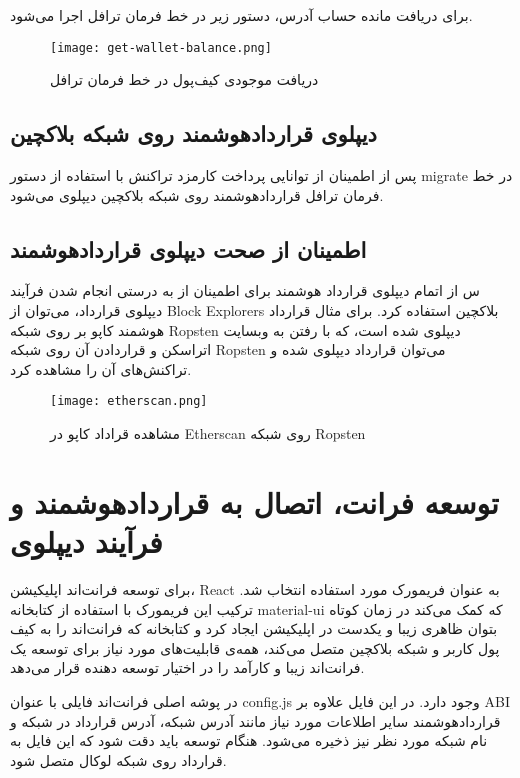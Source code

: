 برای دریافت مانده حساب آدرس، دستور زیر در خط فرمان ترافل اجرا می‌شود.

\begin{figure}[ht]
\centerline{\texttt{[image: get-wallet-balance.png]}}
\caption{دریافت موجودی کیف‌پول در خط فرمان ترافل}
\label{fig:get-wallet-balance}
\end{figure}


\subsection{دیپلوی قراردادهوشمند روی شبکه بلاکچین}
پس از اطمینان از توانایی پرداخت کارمزد تراکنش با استفاده از دستور migrate در خط فرمان ترافل قراردادهوشمند روی شبکه بلاکچین دیپلوی می‌شود.


\subsection{اطمینان از صحت دیپلوی قراردادهوشمند}
س از اتمام دیپلوی قرارداد هوشمند برای اطمینان از به درستی انجام شدن فرآیند دیپلوی قرارداد، می‌توان از
\glspl{Block Explorer}
بلاکچین استفاده کرد. برای مثال قرارداد هوشمند کاپو بر روی شبکه Ropsten دیپلوی شده است، که با رفتن به وبسایت اتراسکن
و قراردادن آن روی شبکه Ropsten می‌توان قرارداد دیپلوی شده و تراکنش‌های آن را مشاهده کرد.


\begin{figure}[ht]
\centerline{\texttt{[image: etherscan.png]}}
\caption{مشاهده قراداد کاپو در Etherscan روی شبکه Ropsten}
\label{fig:etherscan}
\end{figure}


\section{توسعه فرانت، اتصال به قراردادهوشمند و فرآیند دیپلوی}
برای توسعه فرانت‌اند اپلیکیشن، React به عنوان فریمورک مورد استفاده انتخاب شد. ترکیب این فریمورک با استفاده از کتابخانه material-ui که کمک می‌کند در زمان کوتاه بتوان ظاهری زیبا و یکدست در اپلیکیشن ایجاد کرد و کتابخانه
که فرانت‌اند را به کیف پول کاربر و شبکه بلاکچین متصل می‌کند، همه‌ی قابلیت‌های مورد نیاز برای توسعه یک فرانت‌اند زیبا و کارآمد را در اختیار توسعه دهنده قرار می‌دهد.

در پوشه اصلی فرانت‌اند فایلی با عنوان config.js وجود دارد. در این فایل علاوه بر ABI قراردادهوشمند سایر اطلاعات مورد نیاز مانند آدرس شبکه، آدرس قرارداد در شبکه و نام شبکه مورد نظر نیز ذخیره می‌شود. هنگام توسعه باید دقت شود که این فایل به قرارداد روی شبکه لوکال متصل شود.

